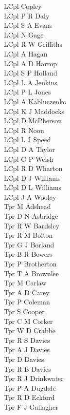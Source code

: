 \begin{multicols}{2}
  LCpl Copley \\
  LCpl P R Daly \\
  LCpl S A Evans \\
  LCpl N Gage \\
  LCpl R W Griffiths \\
  LCpl A Hagan \\
  LCpl A D Harrop \\
  LCpl S P Holland \\
  LCpl L A Jenkins \\
  LCpl P L Jones \\
  LCpl A Kabluczenko \\
  LCpl K J Maddocks \\
  LCpl D McPherson \\
  LCpl R Noon \\
  LCpl L J Speed \\
  LCpl D A Taylor \\
  LCpl G P Welsh \\
  LCpl R D Wharton \\
  LCpl D J Williams \\
  LCpl D L Williams \\
  LCpl J A Wooley \\
  Tpr M Adshead \\
  Tpr D N Asbridge \\
  Tpr R W Bardslcy \\
  Tpr R M Bolton \\
  Tpr G J Borland \\
  Tpr B R Bowers \\
  Tpr P Brotherton \\
  Tpr T A Brownlee \\
  Tpr M Carlaw \\
  Tpr A D Carey \\
  Tpr P Coleman \\
  Tpr S Cooper \\
  Tpr C M Corker \\
  Tpr W D Crabbe \\
  Tpr R S Davies \\
  Tpr A J Davies \\
  Tpr D Davies \\
  Tpr R B Davies \\
  Tpr R J Drinkwater \\
  Tpr P A Dugdale \\
  Tpr R D Eckford \\
  Tpr F J Gallagher \\

\end{multicols}
